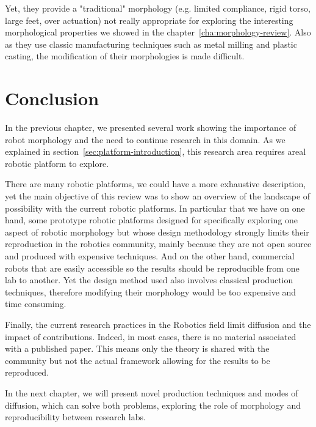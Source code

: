 Yet, they provide a "traditional" morphology (e.g. limited compliance, rigid torso, large feet, over actuation) not really appropriate for exploring the interesting morphological properties we showed in the chapter~\ref{cha:morphology-review}. Also as they use classic manufacturing techniques such as metal milling and plastic casting, the modification of their morphologies is made difficult.

\section{Conclusion}

In the previous chapter, we presented several work showing the importance of robot morphology and the need to continue research in this domain. As we explained in section~\ref{sec:platform-introduction},  this research area requires areal robotic platform to explore.

There are many robotic platforms, we could have a more exhaustive description, yet the main objective of this review was to show an overview of the landscape of possibility with the current robotic platforms. In particular that we have on one hand, some prototype robotic platforms designed for specifically exploring one aspect of robotic morphology but whose design methodology strongly limits their reproduction in the robotics community, mainly because they are not open source and produced with expensive techniques.
And on the other hand, commercial robots that are easily accessible so the results should be reproducible from one lab to another. Yet the design method used also involves classical production techniques, therefore modifying their morphology would be too expensive and time consuming.

Finally, the current research practices in the Robotics field limit diffusion and the impact of contributions.
Indeed, in most cases, there is no material associated with a published paper.
This means only the theory is shared with the community but not the actual framework allowing for the results to be reproduced.

In the next chapter, we will present novel production techniques and modes of diffusion, which can solve both problems, exploring the role of morphology and reproducibility between research labs.






